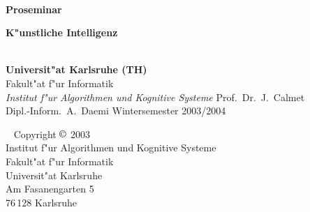 \usepackage{epsf,amsthm,amsmath}
\usepackage[ngerman]{babel}
\usepackage[latin1]{inputenc}
\usepackage{graphicx}
\setlength{\parskip}{5pt plus 8pt minus 2pt}
\pagestyle{headings}

%
%
%


\begin{titlepage}
\ \vfill
\Large
\begin{center}
{\LARGE\bf Proseminar} \\[1cm]
{\huge\bf K"unstliche Intelligenz\par}
\vspace*{1cm}

\\[1cm]
{\bf Universit"at Karlsruhe (TH)}\\
{Fakult"at f"ur Informatik}\\
{\em Institut f"ur Algorithmen und Kognitive Systeme}
\vfill
Prof.~Dr.~J.~Calmet\\
Dipl.-Inform.~A.~Daemi
\vfill\vfill 
Wintersemester 2003/2004
\vfill
\vfill
\end{center}
\end{titlepage} 
% 
\thispagestyle{empty}
\ 
\vfill
\noindent
Copyright $\copyright$ 2003\\
Institut f"ur Algorithmen und Kognitive Systeme\\
Fakult"at f"ur Informatik\\
Universit"at Karlsruhe\\
Am Fasanengarten 5\\
76\,128 Karlsruhe

